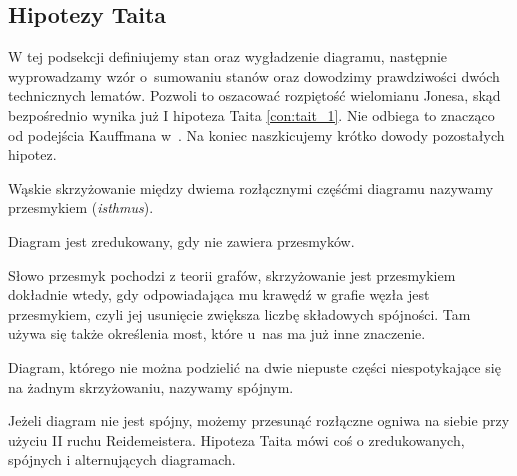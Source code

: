 \subsection{Hipotezy Taita} %
\label{sub:tait_conjectures}
W tej podsekcji definiujemy stan oraz wygładzenie diagramu, następnie wyprowadzamy wzór o~sumowaniu stanów oraz dowodzimy prawdziwości dwóch technicznych lematów.
Pozwoli to oszacować rozpiętość wielomianu Jonesa, skąd bezpośrednio wynika już I hipoteza Taita \ref{con:tait_1}.
Nie odbiega to znacząco od podejścia Kauffmana w~\cite{kauffman87}.
Na koniec naszkicujemy krótko dowody pozostałych hipotez.

\begin{definition}
    \label{def:isthmus}
    Wąskie skrzyżowanie między dwiema rozłącznymi częśćmi diagramu nazywamy przesmykiem (\emph{isthmus}).
\begin{comment}
    \[
        \begin{tikzpicture}[baseline=-0.65ex,scale=0.07]
        \begin{knot}[clip width=5]
            \strand[semithick] (-5,-5) rectangle (5,5);
            \strand[semithick] (-5, -3) [in=right, out=left] to (-15, 3);
            \strand[semithick] (-5, 3) [in=right, out=left] to (-15, -3);

            \node at (-20, -3) {$\ldots$};
            \node at (-20,  3) {$\ldots$};
        \end{knot}
        \end{tikzpicture}
    \]
\end{comment}
    Diagram jest zredukowany, gdy nie zawiera przesmyków.
\end{definition}

Słowo przesmyk pochodzi z teorii grafów, skrzyżowanie jest przesmykiem dokładnie wtedy, gdy odpowiadająca mu krawędź w grafie węzła jest przesmykiem, czyli jej usunięcie zwiększa liczbę składowych spójności.
Tam używa się także określenia most, które u~nas ma już inne znaczenie.

\begin{definition}[spójny]
    Diagram, którego nie można podzielić na dwie niepuste części niespotykające się na żadnym skrzyżowaniu, nazywamy spójnym.
\end{definition}

Jeżeli diagram nie jest spójny, możemy przesunąć rozłączne ogniwa na siebie przy użyciu II ruchu Reidemeistera.
Hipoteza Taita mówi coś o zredukowanych, spójnych i alternujących diagramach.


